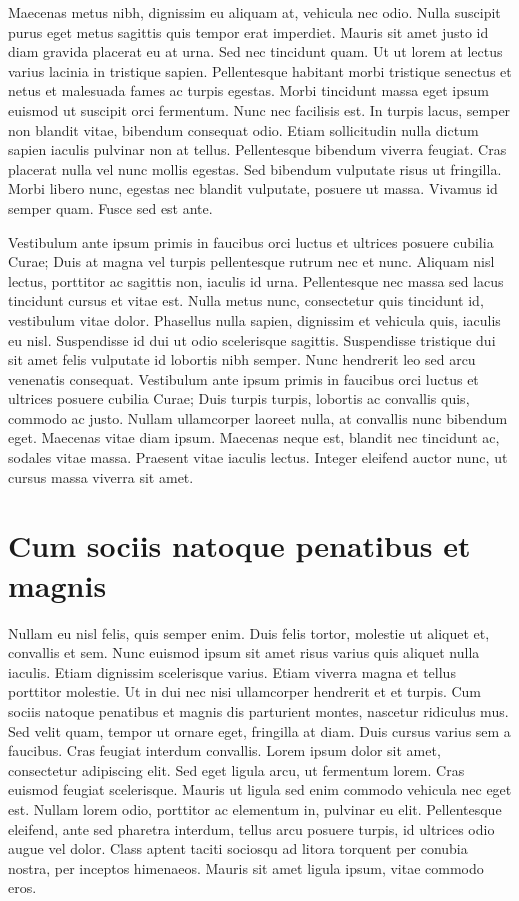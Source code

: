 \documentclass{EPUProjetDi}
\begin{document}
Maecenas metus nibh, dignissim eu aliquam at, vehicula nec odio. Nulla suscipit purus eget metus sagittis quis tempor erat imperdiet. Mauris sit amet justo id diam gravida placerat eu at urna. Sed nec tincidunt quam. Ut ut lorem at lectus varius lacinia in tristique sapien. Pellentesque habitant morbi tristique senectus et netus et malesuada fames ac turpis egestas. Morbi tincidunt massa eget ipsum euismod ut suscipit orci fermentum. Nunc nec facilisis est. In turpis lacus, semper non blandit vitae, bibendum consequat odio. Etiam sollicitudin nulla dictum sapien iaculis pulvinar non at tellus. Pellentesque bibendum viverra feugiat. Cras placerat nulla vel nunc mollis egestas. Sed bibendum vulputate risus ut fringilla. Morbi libero nunc, egestas nec blandit vulputate, posuere ut massa. Vivamus id semper quam. Fusce sed est ante.

Vestibulum ante ipsum primis in faucibus orci luctus et ultrices posuere cubilia Curae; Duis at magna vel turpis pellentesque rutrum nec et nunc. Aliquam nisl lectus, porttitor ac sagittis non, iaculis id urna. Pellentesque nec massa sed lacus tincidunt cursus et vitae est. Nulla metus nunc, consectetur quis tincidunt id, vestibulum vitae dolor. Phasellus nulla sapien, dignissim et vehicula quis, iaculis eu nisl. Suspendisse id dui ut odio scelerisque sagittis. Suspendisse tristique dui sit amet felis vulputate id lobortis nibh semper. Nunc hendrerit leo sed arcu venenatis consequat. Vestibulum ante ipsum primis in faucibus orci luctus et ultrices posuere cubilia Curae; Duis turpis turpis, lobortis ac convallis quis, commodo ac justo. Nullam ullamcorper laoreet nulla, at convallis nunc bibendum eget. Maecenas vitae diam ipsum. Maecenas neque est, blandit nec tincidunt ac, sodales vitae massa. Praesent vitae iaculis lectus. Integer eleifend auctor nunc, ut cursus massa viverra sit amet.

\section{Cum sociis natoque penatibus et magnis}

Nullam eu nisl felis, quis semper enim. Duis felis tortor, molestie ut aliquet et, convallis et sem. Nunc euismod ipsum sit amet risus varius quis aliquet nulla iaculis. Etiam dignissim scelerisque varius. Etiam viverra magna et tellus porttitor molestie. Ut in dui nec nisi ullamcorper hendrerit et et turpis. Cum sociis natoque penatibus et magnis dis parturient montes, nascetur ridiculus mus. Sed velit quam, tempor ut ornare eget, fringilla at diam. Duis cursus varius sem a faucibus. Cras feugiat interdum convallis. Lorem ipsum dolor sit amet, consectetur adipiscing elit. Sed eget ligula arcu, ut fermentum lorem. Cras euismod feugiat scelerisque. Mauris ut ligula sed enim commodo vehicula nec eget est. Nullam lorem odio, porttitor ac elementum in, pulvinar eu elit. Pellentesque eleifend, ante sed pharetra interdum, tellus arcu posuere turpis, id ultrices odio augue vel dolor. Class aptent taciti sociosqu ad litora torquent per conubia nostra, per inceptos himenaeos. Mauris sit amet ligula ipsum, vitae commodo eros.
\end{document}
